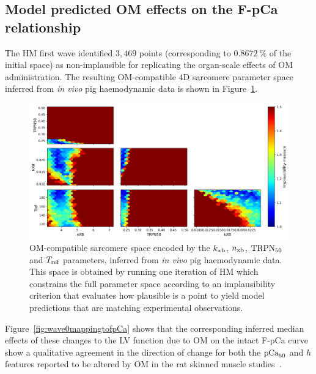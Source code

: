 %
%
%
\subsection{Model predicted OM effects on the F-pCa relationship}\label{sec:ch5model_predicted_om_effects_on_the_fpca_relationship}
The HM first wave identified $3,469$ points (corresponding to $\SI{0.8672}{\percent}$ of the initial space) as non-implausible for replicating the organ-scale effects of OM administration. The resulting OM-compatible $4$D sarcomere parameter space inferred from \textit{in vivo} pig haemodynamic data is shown in Figure~\ref{fig:wave0}. 

\begin{figure}[ht!]
    \myfloatalign
    \includegraphics[width=\textwidth]{figures/chapter05/Fig1.png}
    \caption{OM-compatible sarcomere space encoded by the $k_{\textrm{xb}}$, $n_{\textrm{xb}}$, $\textrm{TRPN}_{50}$ and $T_{\textrm{ref}}$ parameters, inferred from \textit{in vivo} pig haemodynamic data. This space is obtained by running one iteration of HM which constrains the full parameter space according to an implausibility criterion that evaluates how plausible is a point to yield model predictions that are matching experimental observations.}
    \label{fig:wave0}
\end{figure}

\vspace{0.2cm}
Figure~\ref{fig:wave0mappingtofpCa} shows that the corresponding inferred median effects of these changes to the LV function due to OM on the intact F-pCa curve show a qualitative agreement in the direction of change for both the $\textrm{pCa}_{50}$ and $h$ features reported to be altered by OM in the rat skinned muscle studies~\cite{Nagy:2015, Kampourakis:2018, Kieu:2019}.

